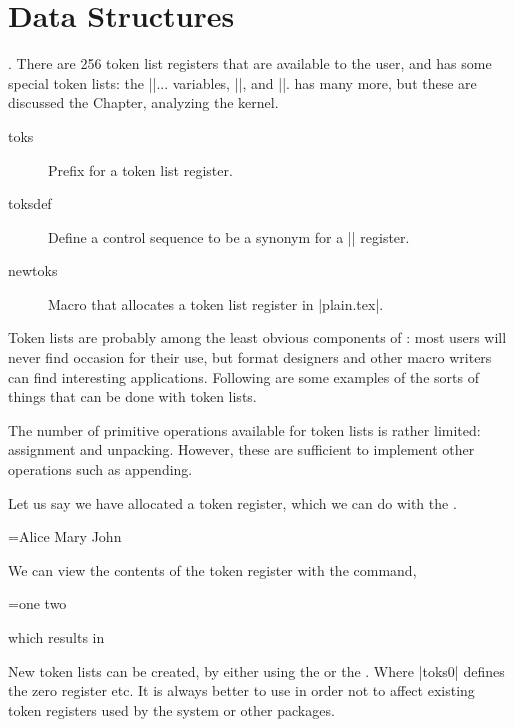 \chapter{Data Structures}

. There are 256 token list registers that are
available to the user, and \tex has some special token lists: the |\every|... variables, |\errhelp|,
and |\output|. \latex has many more, but these are discussed the Chapter, analyzing the \latex kernel.

\begin{description}
\item [toks] Prefix for a token list register.
\item [toksdef]  Define a control sequence to be a synonym for a |\toks| register.
\item [newtoks] Macro that allocates a token list register in |plain.tex|.

\end{description}


Token lists are probably among the least obvious components of \tex: most \tex users will never
find occasion for their use, but format designers and other macro writers can find interesting
applications. Following are some examples of the sorts of things that can be done with token lists.

The number of primitive operations available for token lists is rather limited: assignment and
unpacking. However, these are sufficient to implement other operations such as appending.


Let us say we have allocated a token register, which we can do with the .

\begin{teX}
\newtoks\list
\def\c{Alice Mary John}
\list={\c}
\end{teX}

We can view the contents of the token register with the  command,

\begin{teX}
\the\list

\def\c{one}
\def\d{two}
\newtoks\list 
\list={{\c}{ }{\d}}

\noindent which results in \texttt{\the\list }\relax
\end{teX}
New token lists can be created, by either using the  or the . Where |toks0| defines the zero register etc. It is always better to use  in order not to affect existing token registers used by the system or other packages.


